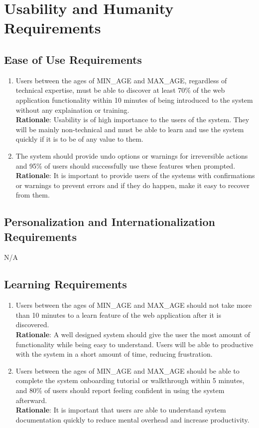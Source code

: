 \documentclass[12pt]{article}
\begin{document}
\section{Usability and Humanity Requirements}
\subsection{Ease of Use Requirements}
\begin{enumerate}[{UH-EU}1.]
    \item Users between the ages of {MIN\_AGE} and {MAX\_AGE},
      regardless of technical expertise, must be able to discover at least 70\% of
      the web application functionality within 10 minutes of being introduced to
      the system without any explaination or training.\\
      \textbf{Rationale}: Usability is of high importance to the users of the system.
      They will be mainly non-technical and must be able to learn and use the
      system quickly if it is to be of any value to them.
    \item The system should provide undo options or warnings for irreversible actions
      and 95\% of users should successfully use these features when prompted.\\
      \textbf{Rationale}: It is important to provide users of the systems with
      confirmations or warnings to prevent errors and if they do happen, make it
      easy to recover from them.
\end{enumerate}
\subsection{Personalization and Internationalization Requirements}
N/A
\subsection{Learning Requirements}
\begin{enumerate}[{UH-LR}1.]
    \item Users between the ages of {MIN\_AGE} and {MAX\_AGE} should not take
      more than 10 minutes to a learn feature of the web application after it is
      discovered.\\
      \textbf{Rationale}: A well designed system should give the user the most amount of
      functionality while being easy to understand. Users will be able to
      productive with the system in a short amount of time, reducing
      frustration.
    \item Users between the ages of {MIN\_AGE} and {MAX\_AGE} should be able to 
      complete the system onboarding tutorial or walkthrough within 5 minutes,
      and 80\% of users should report feeling confident in using the system afterward.\\
      \textbf{Rationale}: It is important that users are able to understand
      system documentation quickly to reduce mental overhead and increase
      productivity.
\end{enumerate}
\end{document}
